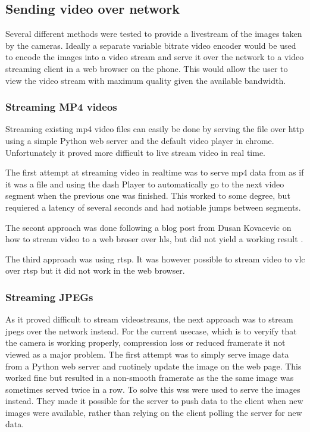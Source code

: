 
\subsection{Sending video over network}
Several different methods were tested to provide a livestream of the images taken by the cameras.
Ideally a separate variable bitrate video encoder would be used to encode the images into a video stream and serve it over the network to a video streaming client in a web browser on the phone.
This would allow the user to view the video stream with maximum quality given the available bandwidth.

\subsubsection{Streaming MP4 videos}
Streaming existing \gls{mp4} video files can easily be done by serving the file over \gls{http} using a simple Python web server and the default video player in \gls{chrome}.
Unfortunately it proved more difficult to live stream video in real time.

The first attempt at streaming video in realtime was to serve \gls{mp4} data from \gs as if it was a file and using the \gls{dash} Player to automatically go to the next video segment when the previous one was finished.
This worked to some degree, but requiered a latency of several seconds and had notiable jumps between segments.

The secont approach was done following a blog post from Dusan Kovacevic on how to stream video to a web broser over \gls{hls}, but did not yield a working result \cite{kovacevicStreamLiveVideo2020}.

The third approach was using \gls{rtsp}.
It was however possible to stream video to \gls{vlc} over \gls{rtsp} but it did not work in the web browser.

\subsubsection{Streaming JPEGs}
As it proved difficult to stream videostreams, the next approach was to stream \glspl{jpeg} over the network instead.
For the current usecase, which is to veryify that the camera is working properly, compression loss or reduced framerate it not viewed as a major problem.
The first attempt was to simply serve image data from a Python web server and ruotinely update the image on the web page.
This worked fine but resulted in a non-smooth framerate as the the same image was sometimes served twice in a row.
To solve this \glspl{ws} were used to serve the images instead.
They made it possible for the server to push data to the client when new images were available, rather than relying on the client polling the server for new data.

